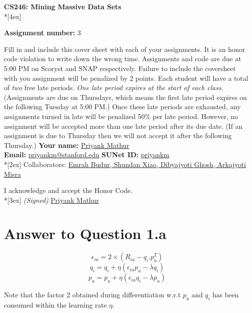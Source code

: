 \documentclass[11pt]{article}
\begin{document}
\thispagestyle{empty}
\parindent 0pt
\vfill
\large

\begin{center}
\LARGE{\bf \textsf{CS246: Mining Massive Data Sets}} \\*[4ex]
\end{center}

{\Large
\textbf{Assignment number:} 3
\vfill
\vfill

Fill in and include this cover sheet with each of your assignments. It is an honor code
violation to write down the wrong time. Assignments and code are due at 5:00 PM on Scoryst and SNAP respectively. Failure to include the coversheet with you assignment will
be penalized by 2 points.
Each student will have a total of \textit{two} free late periods. \textit{One late period expires at the start of
each class}. (Assignments are due on Thursdays, which means the first late period expires on
the following Tuesday at 5:00 PM.) Once these late periods are exhausted, any assignments
turned in late will be penalized 50\% per late period. However, no assignment will be accepted
more than one late period after its due date. (If an assignment is due to Thursday then we
will not accept it after the following Thursday.)
\vfill
\vfill
{\Large
\textbf{Your name:} \underline{Priyank Mathur} \\
\textbf{Email:} \underline{priyankm@stanford.edu} \textbf{SUNet ID:} \underline{priyankm}\\*[2ex] }
Collaborators: \underline{Emrah Budur, Shundan Xiao, Dibyajyoti Ghosh, Arkajyoti Misra} \\
\vfill

\vfill

I acknowledge and accept the Honor Code.\\*[3ex]
\bigskip
\textit{(Signed)} \underline{Priyank Mathur}

\vfill
\vfill

\pagebreak[4]
\section*{Answer to Question 1.a}

$$\epsilon_{iu} = 2 \times (R_{iu} - q_i . p_u^T)$$
$$q_i = q_i + \eta ( \epsilon_{iu} p_u - \lambda q_i)$$
$$p_u= p_u + \eta ( \epsilon_{iu} q_i - \lambda p_u)$$

Note that the factor 2 obtained during differentiation w.r.t $p_u$ and $q_i$ has been consumed within the learning rate $\eta$.

}
\end{document}
